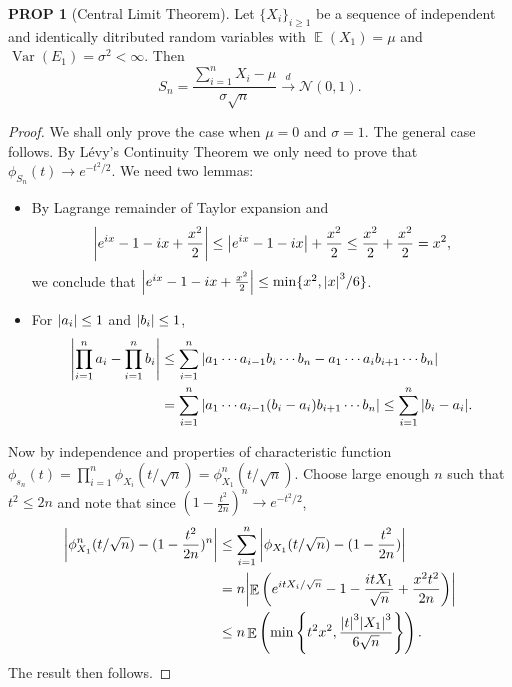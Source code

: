 \documentclass[hidelinks,11pt]{article}
\theoremstyle{definition}
\theoremstyle{dotles}
\theoremstyle{dotless}
\newtheorem{prop}{PROP}[section]
\theoremstyle{remark}
\DeclareMathOperator{\Var}{Var}
\DeclareMathOperator{\E}{\mathbb{E}}
\begin{document}
\begin{prop}[Central Limit Theorem]
Let $\{X_i\}_{i\geq1}$ be a sequence of independent and identically ditributed random variables with $\E(X_1)=\mu$ and $\Var(E_1)=\sigma^2<\infty$. Then
\[S_n=\frac{\sum_{i=1}^nX_i-\mu}{\sigma\sqrt{n}}\xrightarrow{d}\mathcal{N}(0,1).\]
\end{prop}
\begin{proof}
We shall only prove the case when $\mu=0$ and $\sigma=1$. The general case follows. By Lévy's Continuity Theorem we only need to prove that $\phi_{S_n}(t)\to e^{-t^2/2}$. We need two lemmas:\begin{itemize}
    \item By Lagrange remainder of Taylor expansion and
    \[\abs{e^{ix}-1-ix+\frac{x^2}{2}}\leq\abs{e^{ix}-1-ix}+\frac{x^2}{2}\leq\frac{x^2}{2}+\frac{x^2}{2}=x^2,\]
    we conclude that $\abs{e^{ix}-1-ix+\frac{x^2}{2}}\leq\min\{x^2,\abs{x}^3/6\}$.
    \item For $\abs{a_i}\leq1$ and $\abs{b_i}\leq1$,
    \begin{align*}
    \abs{\prod_{i=1}^na_i-\prod_{i=1}^nb_i}&\leq\sum_{i=1}^n\abs{a_1\cdots a_{i-1}b_i\cdots b_n-a_1\cdots a_ib_{i+1}\cdots b_n}\\
    &=\sum_{i=1}^n\abs{a_1\cdots a_{i-1}(b_i-a_i)b_{i+1}\cdots b_n}\leq\sum_{i=1}^n\abs{b_i-a_i}.
    \end{align*}
\end{itemize}
Now by independence and properties of characteristic function $\phi_{s_n}(t)=\prod_{i=1}^n\phi_{X_i}(t/\sqrt{n})=\phi_{X_1}^n(t/\sqrt{n})$. Choose large enough $n$ such that $t^2\leq2n$ and note that since $(1-\frac{t^2}{2n})^n\to e^{-t^2/2}$,
\begin{align*}
    \abs{\phi_{X_1}^n(t/\sqrt{n})-(1-\frac{t^2}{2n})^n}&\leq\sum_{i=1}^n\abs{\phi_{X_1}(t/\sqrt{n})-(1-\frac{t^2}{2n})}\\
    &=n\abs{\E\left(e^{itX_i/\sqrt{n}}-1-\frac{itX_1}{\sqrt{n}}+\frac{x^2t^2}{2n}\right)}\\
    &\leq n\E\left(\min\left\{t^2x^2,\frac{\abs{t}^3\abs{X_1}^3}{6\sqrt{n}}\right\}\right).
\end{align*}
The result then follows.
\end{proof}
\end{document}
